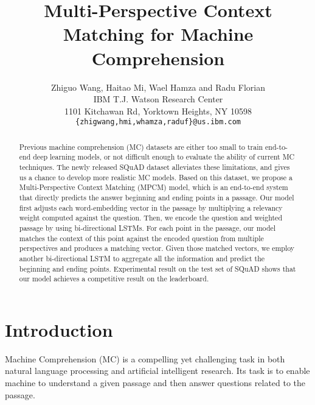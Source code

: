 \documentclass[11pt,letterpaper]{article}
\title{Multi-Perspective Context Matching for Machine Comprehension}
\author{Zhiguo Wang, Haitao Mi, Wael Hamza and Radu Florian \\
IBM T.J. Watson Research Center\\
1101 Kitchawan Rd, Yorktown Heights, NY 10598\\
{\tt \{zhigwang,hmi,whamza,raduf\}@us.ibm.com}}
\date{}
\begin{document}
\maketitle
\begin{abstract}
Previous machine comprehension (MC) datasets are either too small to train end-to-end deep learning models, or not difficult enough to evaluate the ability of current MC techniques. The newly released SQuAD dataset alleviates these limitations, and gives us a chance to develop more realistic MC models. 
Based on this dataset, we propose a Multi-Perspective Context Matching (MPCM) model, 
which is an end-to-end system that directly predicts the answer beginning and ending points in a passage.
Our model first adjusts each word-embedding vector in the passage by multiplying a relevancy weight 
computed against the question.
Then, we encode the question and weighted passage by using bi-directional LSTMs.
For each point in the passage, our model matches the context of this point against the encoded question 
from multiple perspectives and produces a matching vector. 
Given those matched vectors, we employ another bi-directional LSTM to aggregate all the information and 
predict the beginning and ending points.
Experimental result on the test set of SQuAD shows that our model achieves a competitive result on the leaderboard.

\end{abstract}

\section{Introduction}
Machine Comprehension (MC) is a compelling yet challenging task in both natural language processing and artificial intelligent research. Its task is to enable machine to understand a given passage and then answer questions related to the passage. 
\end{document}
